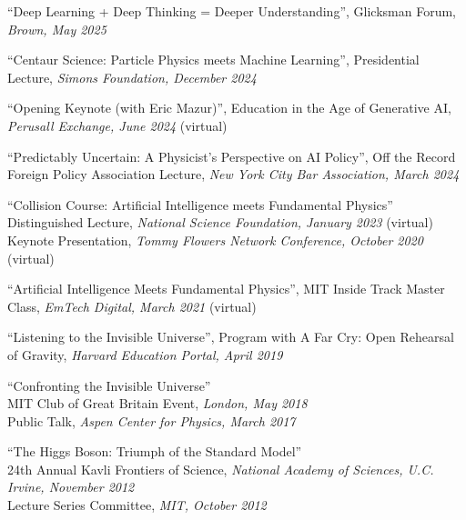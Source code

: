 \bbl

\item ``Deep Learning + Deep Thinking = Deeper Understanding'', Glicksman Forum, \emph{Brown, May 2025}

\item ``Centaur Science:  Particle Physics meets Machine Learning'', Presidential Lecture, \emph{Simons Foundation, December 2024}

\item ``Opening Keynote (with Eric Mazur)'', Education in the Age of Generative AI, \emph{Perusall Exchange, June 2024} (virtual)

\item ``Predictably Uncertain: A Physicist’s Perspective on AI Policy'', Off the Record Foreign Policy Association Lecture, \emph{New York City Bar Association, March 2024}

\item ``Collision Course: Artificial Intelligence meets Fundamental Physics''
\\ Distinguished Lecture, \emph{National Science Foundation, January 2023} (virtual)
\\ Keynote Presentation, \emph{Tommy Flowers Network Conference, October 2020} (virtual)

\item ``Artificial Intelligence Meets Fundamental Physics'', MIT Inside Track Master Class, \emph{EmTech Digital, March 2021} (virtual)

\item ``Listening to the Invisible Universe'', Program with A Far Cry: Open Rehearsal of Gravity, \emph{Harvard Education Portal, April 2019}

\item ``Confronting the Invisible Universe''
\\ MIT Club of Great Britain Event, \emph{London, May 2018}
\\ Public Talk, \emph{Aspen Center for Physics, March 2017}

\item ``The Higgs Boson:  Triumph of the Standard Model''
\\ 24th Annual Kavli Frontiers of Science, \emph{National Academy of Sciences, U.C. Irvine, November 2012}
\\ Lecture Series Committee, \emph{MIT, October 2012}

\el
